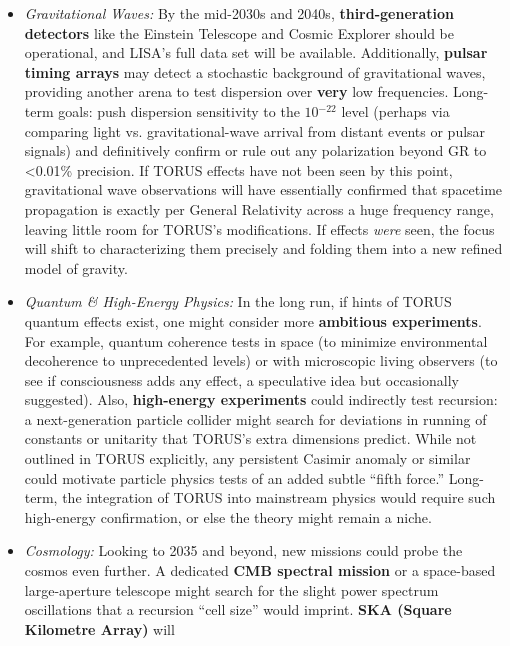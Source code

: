 \documentclass[]{article}
\newcommand{\superscript}[1]{\ensuremath{^{\mathrm{#1}}}}
\begin{document}
\begin{itemize}
  \begin{itemize}
  \item
    \emph{Gravitational Waves:} By the mid-2030s and 2040s,
    \textbf{third-generation detectors} like the Einstein Telescope and
    Cosmic Explorer should be operational, and LISA's full data set will
    be available. Additionally, \textbf{pulsar timing arrays} may detect
    a stochastic background of gravitational waves, providing another
    arena to test dispersion over \textbf{very} low frequencies.
    Long-term goals: push dispersion sensitivity to the
    $10\superscript{−22}$ level (perhaps via comparing light vs.
    gravitational-wave arrival from distant events or pulsar signals)
    and definitively confirm or rule out any polarization beyond GR to
    \textless{}0.01\% precision. If TORUS effects have not been seen by
    this point, gravitational wave observations will have essentially
    confirmed that spacetime propagation is exactly per General
    Relativity across a huge frequency range, leaving little room for
    TORUS's modifications. If effects \emph{were} seen, the focus will
    shift to characterizing them precisely and folding them into a new
    refined model of gravity.
  \item
    \emph{Quantum \& High-Energy Physics:} In the long run, if hints of
    TORUS quantum effects exist, one might consider more
    \textbf{ambitious experiments}. For example, quantum coherence tests
    in space (to minimize environmental decoherence to unprecedented
    levels) or with microscopic living observers (to see if
    consciousness adds any effect, a speculative idea but occasionally
    suggested). Also, \textbf{high-energy experiments} could indirectly
    test recursion: a next-generation particle collider might search for
    deviations in running of constants or unitarity that TORUS's extra
    dimensions predict. While not outlined in TORUS explicitly, any
    persistent Casimir anomaly or similar could motivate particle
    physics tests of an added subtle ``fifth force.'' Long-term, the
    integration of TORUS into mainstream physics would require such
    high-energy confirmation, or else the theory might remain a niche.
  \item
    \emph{Cosmology:} Looking to 2035 and beyond, new missions could
    probe the cosmos even further. A dedicated \textbf{CMB spectral
    mission} or a space-based large-aperture telescope might search for
    the slight power spectrum oscillations that a recursion ``cell
    size'' would imprint​. \textbf{SKA (Square Kilometre Array)} will

\end{itemize}
\end{itemize}
\end{document}

